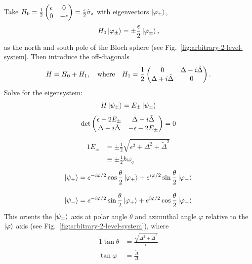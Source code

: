 \documentclass[12pt]{article}
\begin{document}
Take $H_0 = \frac{1}{2}\pmqty{\dmat[0]{\epsilon,-\epsilon}} =
\frac{\epsilon}{2}\hat{\sigma}_z$ with eigenvectors $\ket{\varphi_\pm}$,
\[H_0\ket{\varphi_\pm} = \pm \frac{\epsilon}{2} \ket{\varphi_\pm},\]
as the north and south pole of the Bloch sphere (see
Fig.~\ref{fig:arbitrary-2-level-system}. Then introduce the off-diagonals
\[H = H_0 + H_1, \qq{where} H_1
= \frac{1}{2}\pmqty{\admat[0]{\Delta-i\tilde{\Delta},\Delta+i\tilde{\Delta}}}.\]
Solve for the eigensystem:
\[H\ket{\psi_\pm} = E_\pm\ket{\psi_\pm}\]
\[\det\pmqty{\epsilon - 2E_\pm & \Delta - i\tilde{\Delta}
\\ \Delta + i\tilde{\Delta} & -\epsilon - 2E_\pm} = 0\]
\begin{alignat}{1}
    E_\pm &= \pm\frac{1}{2}\sqrt{\epsilon^2 + \Delta^2 + \tilde{\Delta}^2}
    \\[2ex]
    &\equiv \pm\frac{1}{2}\hbar\omega_q
\end{alignat}
\begin{alignat}{1}
    \ket{\psi_+} &= e^{-i\varphi/2}\cos\frac{\theta}{2}\ket{\varphi_+}
        + e^{i\varphi/2}\sin\frac{\theta}{2}\ket{\varphi_-}
    \\[2ex]
    \ket{\psi_-} &= e^{-i\varphi/2}\sin\frac{\theta}{2}\ket{\varphi_+}
        + e^{i\varphi/2}\cos\frac{\theta}{2}\ket{\varphi_-}
\end{alignat}
This orients the $\ket{\psi_\pm}$ axis at polar angle $\theta$ and azimuthal
angle $\varphi$ relative to the $\ket{\varphi}$ axis (see
Fig.~\ref{fig:arbitrary-2-level-system}), where
\begin{alignat}{1}
    \tan\theta &= \frac{\sqrt{\Delta^2 + \tilde{\Delta}^2}}{\epsilon} \\
    \tan\varphi &= \frac{\tilde{\Delta}}{\Delta}
\end{alignat}
\end{document}
